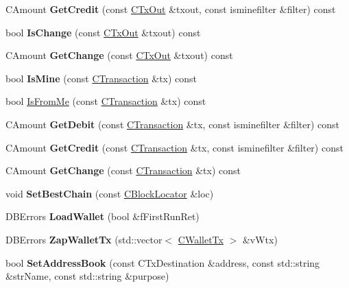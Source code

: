 \begin{DoxyCompactItemize}
\item 
\mbox{\label{class_c_wallet_aa60b69c7d4ea6063ed83b13d7c6fe695}} 
C\+Amount {\bfseries Get\+Credit} (const \mbox{\hyperlink{class_c_tx_out}{C\+Tx\+Out}} \&txout, const isminefilter \&filter) const
\item 
bool {\bfseries Is\+Change} (const \mbox{\hyperlink{class_c_tx_out}{C\+Tx\+Out}} \&txout) const
\item 
\mbox{\label{class_c_wallet_ac1abe6ee00d6a8f20e92e164c423a6d5}} 
C\+Amount {\bfseries Get\+Change} (const \mbox{\hyperlink{class_c_tx_out}{C\+Tx\+Out}} \&txout) const
\item 
\mbox{\label{class_c_wallet_aacddba6a399e67f598d043a369d1ba7c}} 
bool {\bfseries Is\+Mine} (const \mbox{\hyperlink{class_c_transaction}{C\+Transaction}} \&tx) const
\item 
bool \mbox{\hyperlink{class_c_wallet_a553ae4c21d71d887c392ae7b147f9dd0}{Is\+From\+Me}} (const \mbox{\hyperlink{class_c_transaction}{C\+Transaction}} \&tx) const
\item 
\mbox{\label{class_c_wallet_ab443cb2d3a96e324587625e6b41ebcbf}} 
C\+Amount {\bfseries Get\+Debit} (const \mbox{\hyperlink{class_c_transaction}{C\+Transaction}} \&tx, const isminefilter \&filter) const
\item 
\mbox{\label{class_c_wallet_ae85ae49c421a405fe091ad4afa839241}} 
C\+Amount {\bfseries Get\+Credit} (const \mbox{\hyperlink{class_c_transaction}{C\+Transaction}} \&tx, const isminefilter \&filter) const
\item 
\mbox{\label{class_c_wallet_a3e9a088a7b6b77edd7a0f80ed246eb58}} 
C\+Amount {\bfseries Get\+Change} (const \mbox{\hyperlink{class_c_transaction}{C\+Transaction}} \&tx) const
\item 
void {\bfseries Set\+Best\+Chain} (const \mbox{\hyperlink{struct_c_block_locator}{C\+Block\+Locator}} \&loc)
\item 
D\+B\+Errors {\bfseries Load\+Wallet} (bool \&f\+First\+Run\+Ret)
\item 
D\+B\+Errors {\bfseries Zap\+Wallet\+Tx} (std\+::vector$<$ \mbox{\hyperlink{class_c_wallet_tx}{C\+Wallet\+Tx}} $>$ \&v\+Wtx)
\item 
bool {\bfseries Set\+Address\+Book} (const C\+Tx\+Destination \&address, const std\+::string \&str\+Name, const std\+::string \&purpose)

\end{DoxyCompactItemize}
